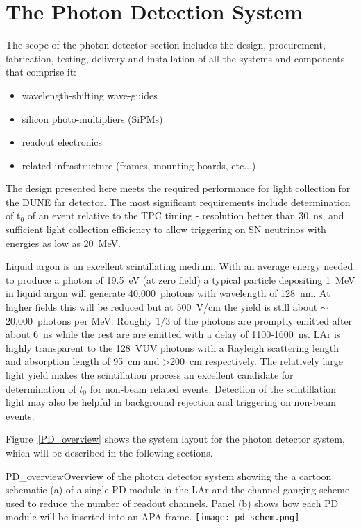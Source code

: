 \section{The Photon Detection System}
\label{sec:detectors-fd-ref-pd}

The scope of the photon detector section includes the design,
procurement, fabrication, testing, delivery and installation of all
the systems and components that comprise it:  

\begin{itemize}
\item wavelength-shifting wave-guides
\item silicon photo-multipliers (SiPMs)
\item readout electronics
\item related infrastructure (frames, mounting boards, etc...)
\end{itemize}

The design presented here meets the required performance for light
collection for the DUNE far detector. The most significant
requirements include determination of t$_0$ of an event relative to
the TPC timing - resolution better than 30~ns, and sufficient light
collection efficiency to allow triggering on SN neutrinos with
energies as low as 20~MeV.

Liquid argon is an excellent scintillating medium. With an average
energy needed to produce a photon of 19.5~eV (at zero field) a typical
particle depositing 1~MeV in liquid argon will generate 40,000~photons
with wavelength of 128~nm. At higher fields this will be reduced but
at 500~V/cm the yield is still about $\sim$20,000~photons per
MeV. Roughly 1/3 of the photons are promptly emitted after about 6~ns
while the rest are are emitted with a delay of 1100-1600~ns. LAr
is highly transparent to the 128~VUV photons with a Rayleigh
scattering length and absorption length of 95~cm and >200~cm
respectively. The relatively large light yield makes the scintillation
process an excellent candidate for determination of $t_{0}$ for
non-beam related events. Detection of the scintillation light may also
be helpful in background rejection and triggering on non-beam events.  

Figure~\ref{PD_overview} shows the system layout for the photon
detector system, which will be described in the following sections. 

\begin{cdrfigure}[PD Overview]{PD_overview}{Overview of the photon detector
    system showing the a cartoon schematic (a) of a single PD module
    in the LAr and the channel ganging scheme used to reduce the
    number of readout channels. Panel (b) shows how each PD module
    will be inserted into an APA frame. }
\texttt{[image: pd\_schem.png]}
\end{cdrfigure}

